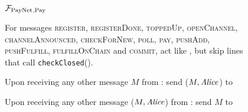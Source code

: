 \begin{figure}[!htbp]
  \begin{systembox}{$\mathcal{F}_{\mathrm{PayNet}}{}_{\mathrm{, Pay}}$}
    \begin{algorithmic}[1]
      \State For messages \textsc{register}, \textsc{registerDone},
      \textsc{toppedUp}, \textsc{openChannel}, \textsc{channelAnnounced},
      \textsc{checkForNew}, \textsc{poll}, \textsc{pay}, \textsc{pushAdd},
      \textsc{pushFulfill}, \textsc{fulfillOnChain} and \textsc{commit}, act
      like \fpaynet{}, but skip lines that call \texttt{checkClosed}().
      \Statex

      \State Upon receiving any other message $M$ from \alice:
      \Indent
          \State send ($M, \mathit{Alice}$) to \simulator
        \EndIf
      \EndIndent
      \Statex

      \State Upon receiving any other message ($M, \mathit{Alice}$) from \simulator:
      \Indent
          \State send $M$ to \alice
        \EndIf
      \EndIndent
    \end{algorithmic}
  \end{systembox}
  \caption{}
  \label{alg:proof:fpaynet:pay}
\end{figure}

